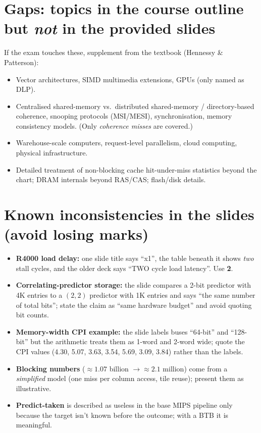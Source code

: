 \section{Gaps: topics in the course outline but \emph{not} in the provided slides}
If the exam touches these, supplement from the textbook (Hennessy \& Patterson):
\begin{itemize}
\item Vector architectures, SIMD multimedia extensions, GPUs (only named as DLP).
\item Centralised shared-memory vs.\ distributed shared-memory / directory-based coherence, snooping protocols (MSI/MESI), synchronisation, memory consistency models. (Only \emph{coherence misses} are covered.)
\item Warehouse-scale computers, request-level parallelism, cloud computing, physical infrastructure.
\item Detailed treatment of non-blocking cache hit-under-miss statistics beyond the chart; DRAM internals beyond RAS/CAS; flash/disk details.
\end{itemize}

\section{Known inconsistencies in the slides (avoid losing marks)}
\begin{itemize}
\item \textbf{R4000 load delay:} one slide title says ``x1'', the table beneath it shows \emph{two} stall cycles, and the older deck says ``TWO cycle load latency''. Use \textbf{2}.
\item \textbf{Correlating-predictor storage:} the slide compares a 2-bit predictor with 4K entries to a $(2,2)$ predictor with 1K entries and says ``the same number of total bits''; state the claim as ``same hardware budget'' and avoid quoting bit counts.
\item \textbf{Memory-width CPI example:} the slide labels buses ``64-bit'' and ``128-bit'' but the arithmetic treats them as 1-word and 2-word wide; quote the CPI values (4.30, 5.07, 3.63, 3.54, 5.69, 3.09, 3.84) rather than the labels.
\item \textbf{Blocking numbers} ($\approx1.07$ billion $\to\approx2.1$ million) come from a \emph{simplified} model (one miss per column access, tile reuse); present them as illustrative.
\item \textbf{Predict-taken} is described as useless in the base MIPS pipeline only because the target isn't known before the outcome; with a BTB it is meaningful.
\end{itemize}

